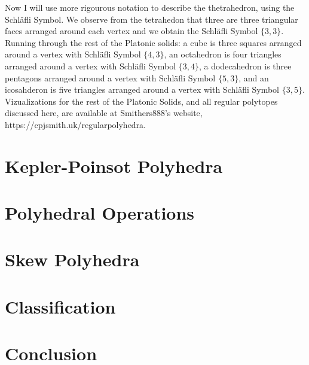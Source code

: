 \documentclass{article}
\begin{document}
Now I will use more rigourous notation to describe the thetrahedron, using the Schläfli Symbol. 
We observe from the tetrahedon that three are three triangular faces arranged around each vertex and we obtain the Schläfli Symbol $\{3,3\}$. 
Running through the rest of the Platonic solids: a cube is three squares arranged around a vertex with Schläfli Symbol $\{4,3\}$, 
an octahedron is four triangles arranged around a vertex with Schläfli Symbol $\{3,4\}$, 
a dodecahedron is three pentagons arranged around a vertex with Schläfli Symbol $\{5,3\}$, 
and an icosahderon is five triangles arranged around a vertex with Schläfli Symbol $\{3,5\}$. Vizualizations for the rest of the Platonic Solids, 
and all regular polytopes discussed here, are available at Smithers888's website, https://cpjsmith.uk/regularpolyhedra.

\section{Kepler-Poinsot Polyhedra}

\section{Polyhedral Operations}

\section{Skew Polyhedra}

\section {Classification}

\section{Conclusion}

\newpage

\nocite{*}
\printbibliography{}
\end{document}
